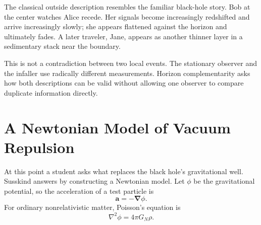The classical outside description resembles the familiar black-hole story. Bob at the center watches Alice recede. Her signals become increasingly redshifted and arrive increasingly slowly; she appears flattened against the horizon and ultimately fades. A later traveler, Jane, appears as another thinner layer in a sedimentary stack near the boundary.

\begin{classroomqa}
\end{classroomqa}

\begin{classroomqa}
\end{classroomqa}

This is not a contradiction between two local events. The stationary observer and the infaller use radically different measurements. Horizon complementarity asks how both descriptions can be valid without allowing one observer to compare duplicate information directly.

\section{A Newtonian Model of Vacuum Repulsion}

At this point a student asks what replaces the black hole's gravitational well. Susskind answers by constructing a Newtonian model. Let \(\phi\) be the gravitational potential, so the acceleration of a test particle is
\begin{equation}
\mathbf{a}=-\boldsymbol{\nabla}\phi.
\end{equation}
For ordinary nonrelativistic matter, Poisson's equation is
\begin{equation}
\nabla^2\phi=4\pi G_N\rho.
\label{eq:l09-poisson}
\end{equation}

